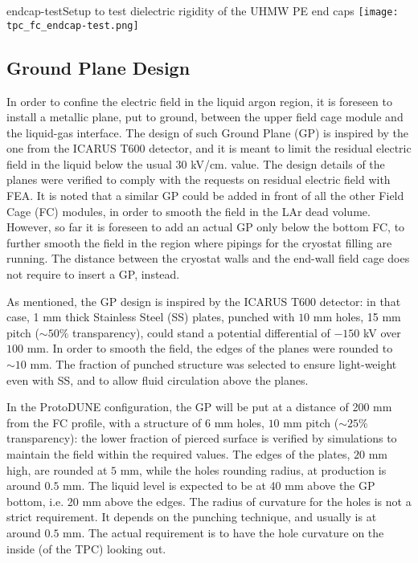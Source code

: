 \begin{cdrfigure}{endcap-test}{Setup to test dielectric rigidity of the UHMW PE end caps}
\texttt{[image: tpc\_fc\_endcap-test.png]}
\end{cdrfigure}





\subsection{Ground Plane Design}

In order to confine the electric field in the liquid argon region, it is foreseen to install a metallic plane, put to ground, between the upper field cage module and the liquid-gas interface. The design of such Ground Plane (GP) is inspired by the one from the ICARUS T600 detector, and it is meant to limit the residual electric field in the liquid below the usual 30 kV/cm. value. The design details of the planes were verified to comply with the requests on residual electric field with FEA. It is noted that a similar GP could be added in front of all the other Field Cage (FC) modules, in order to smooth the field in the LAr dead volume. However, so far it is foreseen to add an actual GP only below the bottom FC, to further smooth the field in the region where pipings for the cryostat filling are running. The distance between the cryostat walls and the end-wall field cage does not require to insert a GP, instead.

As mentioned, the GP design is inspired by the ICARUS T600 detector: in that case, 1 mm thick Stainless Steel (SS) plates, punched with $10$ mm holes, 15 mm pitch ($\sim 50\%$ transparency), could stand a potential differential of $-150$ kV over $100$ mm. In order to smooth the field, the edges of the planes were rounded to $\sim 10$ mm. The fraction of punched structure was selected to ensure light-weight even with SS, and to allow fluid circulation above the planes.

In the ProtoDUNE configuration, the GP will be put at a distance of 200 mm from the FC profile, with a structure of $6$ mm holes, $10$ mm pitch ($\sim 25\%$ transparency): the lower fraction of pierced surface is verified by simulations to maintain the field within the required values. The edges of the plates, $20$ mm high, are rounded at $5$ mm, while the holes rounding radius, at production is around $0.5$ mm. The liquid level is expected to be at 40 mm above the GP bottom, i.e. 20 mm above the edges. The radius of curvature for the holes is not a strict requirement. It depends on the punching technique, and usually is at around $0.5$ mm. The actual requirement is to have the hole curvature on the inside (of the TPC) looking out.

